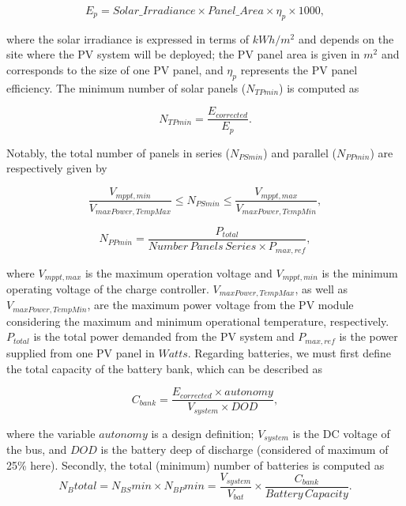 \documentclass[runningheads]{llncs}
\begin{document}
\begin{equation}
\label{eq:Ep}
E_{p} = Solar\_Irradiance \times Panel\_Area \times \eta_{p} \times 1000,
\end{equation}

\noindent where the solar irradiance is expressed in terms of $kWh/m^{2}$ and depends on the site where the PV system will be deployed; 
the PV panel area is given in $m^{2}$ and corresponds to the size of one PV panel, and $\eta_{p}$ represents the PV panel efficiency.
The minimum number of solar panels ($N_{TPmin}$) is computed as

\begin{equation}
\label{eq:NTPmin}
N_{TPmin} = \frac{E_{corrected}}{E_{p}}.
\end{equation}

Notably, the total number of panels in series ($N_{PSmin}$) and parallel ($N_{PPmin}$) are respectively given by

\begin{equation}
\label{eq:NPSmin}
\frac{V_{mppt,min}}{V_{maxPower,TempMax}} \leq N_{PSmin} \leq \frac{V_{mppt,max}}{V_{maxPower,TempMin}},
\end{equation}

\begin{equation}
\label{eq:NPPmin}
N_{PPmin} = \frac{P_{total}}{Number\,Panels\,Series \times P_{max,ref}},
\end{equation}

\noindent where $V_{mppt, max}$ is the maximum operation voltage and $V_{mppt,min}$ is the minimum operating voltage of the charge controller. $V_{maxPower, TempMax}$, as well as $V_{maxPower, TempMin}$, are the maximum power voltage from the PV module considering the maximum and minimum operational temperature, respectively. $P_{total}$ is the total power demanded from the PV system and $P_{max, ref}$ is the power supplied from one PV panel in $Watts$. Regarding batteries, we must first define the total capacity of the battery bank, which can be described as

\begin{equation}
\label{eq:Cbank}
C_{bank} = \frac{E_{corrected} \times autonomy}{V_{system} \times DOD},
\end{equation}

\noindent where the variable $autonomy$ is a design definition; 
$ V_{system} $ is the DC voltage of the bus, and $ DOD $ is the battery deep of discharge (considered of maximum of 25\% here).
Secondly, the total (minimum) number of batteries is computed as 
\begin{equation}
\label{eq:Nbtotal}
N_{B}total = N_{BS}min \times N_{BP}min = \frac{V_{system}}{V_{bat}} \times \frac{C_{bank}}{Battery \, Capacity}.
\end{equation}
\end{document}
